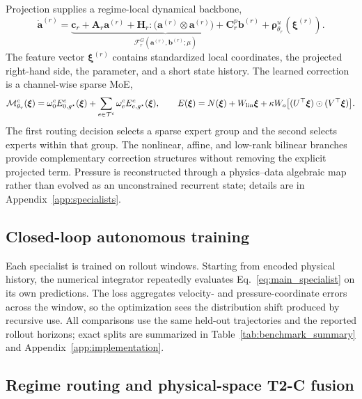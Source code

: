 Projection supplies a regime-local dynamical backbone,
\begin{equation}
  \dot{\bm a}^{(r)}=
  \underbrace{\bm c_r+\bm A_r\bm a^{(r)}+
  \bm H_r:\bigl(\bm a^{(r)}\otimes\bm a^{(r)}\bigr)+
  \bm C^p_r\bm b^{(r)}}_{\mathcal F_r^{G}(\bm a^{(r)},\bm b^{(r)};\mu)}
  +\bm\rho^u_{\theta_r}(\bm\xi^{(r)}).
  \label{eq:main_specialist}
\end{equation}
The feature vector $\bm\xi^{(r)}$ contains standardized local coordinates, the projected right-hand side, the parameter, and a short state history. The learned correction is a channel-wise sparse MoE,
\begin{equation}
  \mathcal M^c_{\theta_r}(\bm\xi)=
  \omega^c_0 E^c_{0,g^\star}(\bm\xi)+
  \sum_{e\in\mathcal T^c}\omega^c_e E^c_{e,g^\star}(\bm\xi),
  \qquad
  E(\bm\xi)=N(\bm\xi)+W_{\rm lin}\bm\xi+
  \kappa W_o\bigl[(U^\top\bm\xi)\odot(V^\top\bm\xi)\bigr].
  \label{eq:main_inner_moe}
\end{equation}
The first routing decision selects a sparse expert group and the second selects experts within that group. The nonlinear, affine, and low-rank bilinear branches provide complementary correction structures without removing the explicit projected term. Pressure is reconstructed through a physics--data algebraic map rather than evolved as an unconstrained recurrent state; details are in Appendix~\ref{app:specialists}.

\subsection{Closed-loop autonomous training}

Each specialist is trained on rollout windows. Starting from encoded physical history, the numerical integrator repeatedly evaluates Eq.~\eqref{eq:main_specialist} on its own predictions. The loss aggregates velocity- and pressure-coordinate errors across the window, so the optimization sees the distribution shift produced by recursive use. All comparisons use the same held-out trajectories and the reported rollout horizons; exact splits are summarized in Table~\ref{tab:benchmark_summary} and Appendix~\ref{app:implementation}.

\subsection{Regime routing and physical-space T2-C fusion}

